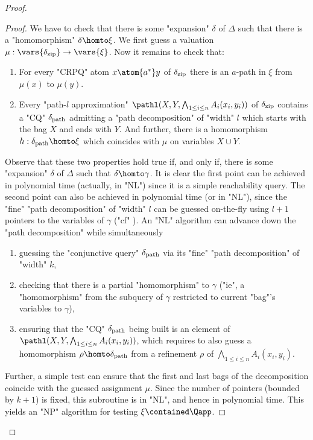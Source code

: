 \begin{proof}
\begin{proof}
        We have to check that there is some "expansion" $\delta$ of $\Delta$ such that there is a "homomorphism" $\delta \homto \xi$. 
        We first guess a valuation $\mu :  \vars{\delta_{\textup{zip}}} \to \vars{\xi}$.
        Now it remains to check that:
        \begin{enumerate}
          \item For every "CRPQ" atom $x \atom{a^*} y$ of $\delta_{\textup{zip}}$ there is an $a$-path in $\xi$ from $\mu(x)$ to $\mu(y)$.
          \item Every "path-$l$ approximation" $\pathl(X, Y, \bigwedge_{1 \leq i \leq n} A_i(x_i,y_i))$ of $\delta_{\textup{zip}}$ contains a "CQ" $\delta_{\textup{path}}$  admitting a "path decomposition" of "width" $l$ which starts with the bag $X$ and ends with $Y$. And further, there is a homomorphism $h: \delta_{\textup{path}}  \homto \xi$ which coincides with $\mu$ on variables $X \cup Y$.
        \end{enumerate}
        Observe that  these two properties hold true if, and only if, there is some "expansion" $\delta$ of $\Delta$ such that $\delta \homto \gamma$.
        It is clear the first point can be achieved in polynomial time (actually, in "NL") since it is a simple reachability query. 
        The second point can also be achieved in polynomial time (or in "NL"), since the "fine" "path decomposition" of "width" $l$ can be guessed on-the-fly using $l+1$ pointers to the variables of $\gamma$ ("cf" ). An "NL" algorithm can advance down the "path decomposition" while simultaneously
        \begin{enumerate}
          \item guessing the "conjunctive query" $\delta_{\textup{path}}$ via its "fine" "path decomposition" of "width" $k$,
          \item checking that there is a partial "homomorphism" to $\gamma$ ("ie", a "homomorphism" from the subquery of $\gamma$ restricted to current "bag"'s variables to $\gamma$),
          \item ensuring that the "CQ" $\delta_{\textup{path}}$ being built is an element of $\pathl(X, Y, \bigwedge_{1 \leq i \leq n} A_i(x_i,y_i))$, which requires to also guess a homomorphism $\rho \homto \delta_{\textup{path}}$ from a refinement $\rho$ of $\bigwedge_{1 \leq i \leq n} A_i(x_i,y_i)$.
        \end{enumerate}
        Further, a simple test can ensure that the first and last bags of the decomposition  coincide with the guessed assignment $\mu$.
        Since the number of pointers (bounded by $k+1$) is fixed, this subroutine is in "NL", and hence in polynomial time. This yields an "NP" algorithm for testing $\xi \contained \Qapp$.
  \end{proof}



\end{proof}
